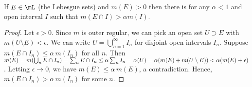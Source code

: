 \documentclass{article}
\begin{document}
 If $E \in \mL$ (the Lebesgue sets) and $m(E) > 0$ then there is for any $\alpha < 1$ and open interval $I$ such that $m(E \cap I) > \alpha m(I)$.
\begin{proof}
Let $\epsilon > 0$. Since $m$ is outer regular, we can pick an open set $U \supset E$ with $m(U \setminus E) < \epsilon$. We can write $U = \bigcup_{n=1}^\infty I_n$ for disjoint open intervals $I_n$.  Suppose $m(E \cap I_n) \le \alpha \,m(I_n)$ for all $n$.  Then $m(E) = m(\bigcup_n E \cap I_n) = 
\sum_n E \cap I_n \le \alpha \sum_n I_n = \alpha (U) = \alpha(m(E) + m(U\setminus E)) < \alpha(m(E) + \epsilon)$. Letting $\epsilon \to 0$, we have $m(E) \le \alpha \,m(E)$, a contradiction. Hence, $m(E \cap I_n) > \alpha \, m(I_n)$ for some $n$.
\end{proof} 
\end{document}

